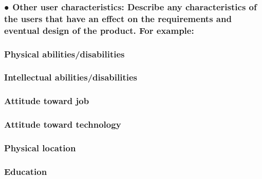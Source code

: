\documentclass[
]{article}
\begin{document}
\hypertarget{other-user-characteristics-describe-any-characteristics-of-the-users-that-have-an-effect-on-the-requirements-and-eventual-design-of-the-product.-for-example}{%
\subsubsection{\texorpdfstring{● Other user characteristics: Describe
any characteristics of the users that have an effect on the requirements
and eventual design of the product. For example:
}{● Other user characteristics: Describe any characteristics of the users that have an effect on the requirements and eventual design of the product. For example: }}\label{other-user-characteristics-describe-any-characteristics-of-the-users-that-have-an-effect-on-the-requirements-and-eventual-design-of-the-product.-for-example}}

\hypertarget{physical-abilitiesdisabilities}{%
\subsubsection{Physical
abilities/disabilities}\label{physical-abilitiesdisabilities}}

\hypertarget{intellectual-abilitiesdisabilities}{%
\subsubsection{Intellectual
abilities/disabilities}\label{intellectual-abilitiesdisabilities}}

\hypertarget{attitude-toward-job}{%
\subsubsection{Attitude toward job}\label{attitude-toward-job}}

\hypertarget{attitude-toward-technology}{%
\subsubsection{Attitude toward
technology}\label{attitude-toward-technology}}

\hypertarget{physical-location}{%
\subsubsection{Physical location}\label{physical-location}}

\hypertarget{education}{%
\subsubsection{Education}\label{education}}
\end{document}

